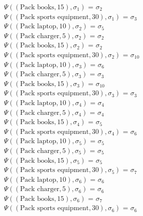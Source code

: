 \documentclass[a4paper]{article}
\begin{document}
$\Psi((\text{Pack books},15),\sigma_1)$ = $\sigma_2$ \\[0.1\baselineskip] 
$\Psi((\text{Pack sports equipment},30),\sigma_1)$ = $\sigma_3$ \\[0.7\baselineskip]
$\Psi((\text{Pack laptop},10),\sigma_2)$ = $\sigma_5$ \\[0.1\baselineskip] 
$\Psi((\text{Pack charger},5),\sigma_2)$ = $\sigma_2$ \\[0.1\baselineskip] 
$\Psi((\text{Pack books},15),\sigma_2)$ = $\sigma_2$ \\[0.1\baselineskip] 
$\Psi((\text{Pack sports equipment},30),\sigma_2)$ = $\sigma_{10}$ \\[0.7\baselineskip]
$\Psi((\text{Pack laptop},10),\sigma_3)$ = $\sigma_6$ \\[0.1\baselineskip] 
$\Psi((\text{Pack charger},5),\sigma_3)$ = $\sigma_3$ \\[0.1\baselineskip] 
$\Psi((\text{Pack books},15),\sigma_3)$ = $\sigma_{10}$ \\[0.1\baselineskip] 
$\Psi((\text{Pack sports equipment},30),\sigma_3)$ = $\sigma_3$ \\[0.7\baselineskip]
$\Psi((\text{Pack laptop},10),\sigma_4)$ = $\sigma_4$ \\[0.1\baselineskip] 
$\Psi((\text{Pack charger},5),\sigma_4)$ = $\sigma_4$ \\[0.1\baselineskip] 
$\Psi((\text{Pack books},15),\sigma_4)$ = $\sigma_5$ \\[0.1\baselineskip] 
$\Psi((\text{Pack sports equipment},30),\sigma_4)$ = $\sigma_6$ \\[0.7\baselineskip]
$\Psi((\text{Pack laptop},10),\sigma_5)$ = $\sigma_5$ \\[0.1\baselineskip] 
$\Psi((\text{Pack charger},5),\sigma_5)$ = $\sigma_5$ \\[0.1\baselineskip] 
$\Psi((\text{Pack books},15),\sigma_5)$ = $\sigma_5$ \\[0.1\baselineskip] 
$\Psi((\text{Pack sports equipment},30),\sigma_5)$ = $\sigma_7$ \\[0.7\baselineskip]
$\Psi((\text{Pack laptop},10),\sigma_6)$ = $\sigma_6$ \\[0.1\baselineskip] 
$\Psi((\text{Pack charger},5),\sigma_6)$ = $\sigma_6$ \\[0.1\baselineskip] 
$\Psi((\text{Pack books},15),\sigma_6)$ = $\sigma_7$ \\[0.1\baselineskip] 
$\Psi((\text{Pack sports equipment},30),\sigma_6)$ = $\sigma_6$ \\[0.7\baselineskip]
\end{document}
